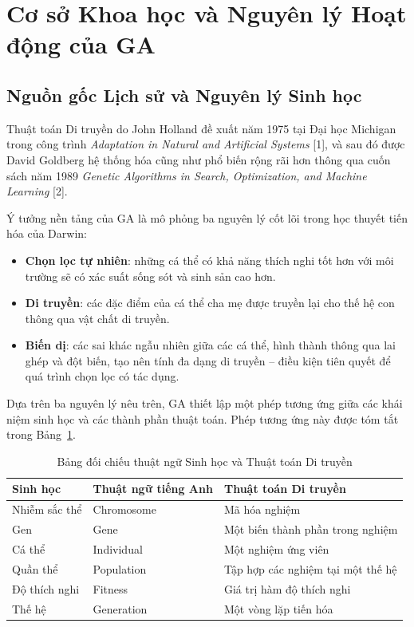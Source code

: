 \section{Cơ sở Khoa học và Nguyên lý Hoạt động của GA}
\label{sec:co-so-khoa-hoc}

\subsection*{Nguồn gốc Lịch sử và Nguyên lý Sinh học}
\label{subsec:nguon-goc-lich-su}

Thuật toán Di truyền do John Holland đề xuất năm 1975 tại Đại học
Michigan trong công trình \textit{Adaptation in Natural and Artificial
Systems} [1], và sau đó được David Goldberg hệ thống hóa cũng như phổ
biến rộng rãi hơn thông qua cuốn sách năm 1989 \textit{Genetic
Algorithms in Search, Optimization, and Machine Learning} [2].

Ý tưởng nền tảng của GA là mô phỏng ba nguyên lý cốt lõi trong học
thuyết tiến hóa của Darwin:

\begin{itemize}
    \item \textbf{Chọn lọc tự nhiên}: những cá thể có khả năng thích nghi tốt hơn với môi
    trường sẽ có xác suất sống sót và sinh sản cao hơn.
    \item \textbf{Di truyền}: các đặc điểm của cá thể cha mẹ được truyền
    lại cho thế hệ con thông qua vật chất di truyền.
    \item \textbf{Biến dị}: các sai khác ngẫu nhiên giữa các cá thể,
    hình thành thông qua lai ghép và đột biến, tạo nên tính đa dạng
    di truyền -- điều kiện tiên quyết để quá trình chọn lọc có tác dụng.
\end{itemize}

Dựa trên ba nguyên lý nêu trên, GA thiết lập một phép tương ứng giữa
các khái niệm sinh học và các thành phần thuật toán. Phép tương ứng
này được tóm tắt trong Bảng~\ref{tab:doi-chieu-thuat-ngu}.

\begin{table}[htbp]
\centering
\caption{Bảng đối chiếu thuật ngữ Sinh học và Thuật toán Di truyền}
\label{tab:doi-chieu-thuat-ngu}
\begin{tabular}{lll}
\toprule
\textbf{Sinh học} & \textbf{Thuật ngữ tiếng Anh}
& \textbf{Thuật toán Di truyền} \\
\midrule
Nhiễm sắc thể & Chromosome & Mã hóa nghiệm \\
Gen           & Gene       & Một biến thành phần trong nghiệm \\
Cá thể        & Individual & Một nghiệm ứng viên \\
Quần thể      & Population & Tập hợp các nghiệm tại một thế hệ \\
Độ thích nghi & Fitness    & Giá trị hàm độ thích nghi \\
Thế hệ        & Generation & Một vòng lặp tiến hóa \\
\bottomrule
\end{tabular}
\end{table}

